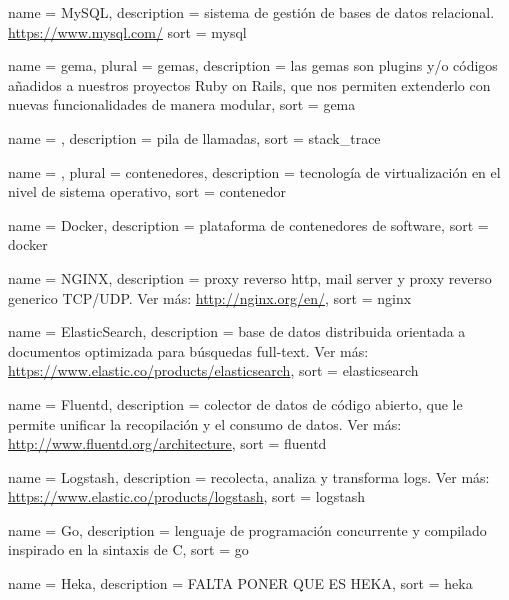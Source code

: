  {
  name        = {MySQL},
  description =
    {sistema de gestión de bases de datos relacional.
    \url{https://www.mysql.com/}}
  sort        = {mysql}
}

 {
  name        = {gema},
  plural      = {gemas},
  description =
    {las gemas son plugins y/o códigos añadidos a nuestros proyectos Ruby on
    Rails, que nos permiten extenderlo con nuevas funcionalidades de manera
    modular},
  sort        = {gema}
}

 {
  name        = {},
  description = {pila de llamadas},
  sort        = {stack_trace}
}

 {
  name        = {},
  plural      = {contenedores},
  description = {tecnología de virtualización en el nivel de sistema operativo},
  sort        = {contenedor}
}

 {
  name        = {Docker},
  description = {plataforma de contenedores de software},
  sort        = {docker}
}

 {
  name        = {NGINX},
  description =
    {proxy reverso http, mail server y proxy reverso generico TCP/UDP.
    Ver más: \url{http://nginx.org/en/}},
  sort        = {nginx}
}

 {
  name        = {ElasticSearch},
  description =
    {base de datos distribuida orientada a documentos optimizada para búsquedas
    full-text. Ver más: \url{https://www.elastic.co/products/elasticsearch}},
  sort        = {elasticsearch}
}

 {
  name        = {Fluentd},
  description =
    {colector de datos de código abierto, que le permite unificar
    la recopilación y el consumo de datos. Ver más:
    \url{http://www.fluentd.org/architecture}},
  sort        = {fluentd}
}

 {
  name        = {Logstash},
  description =
    {recolecta, analiza y transforma logs. Ver más:
    \url{https://www.elastic.co/products/logstash}},
  sort        = {logstash}
}

 {
  name        = {Go},
  description =
    {lenguaje de programación concurrente y compilado inspirado en la sintaxis
    de C},
  sort        = {go}
}

 {
  name        = {Heka},
  description = {FALTA PONER QUE ES HEKA},
  sort        = {heka}
}

